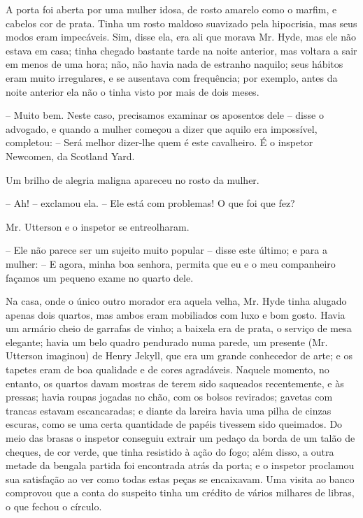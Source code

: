 A porta foi aberta por uma mulher idosa, de rosto amarelo como o marfim,
e cabelos cor de prata.  Tinha um rosto maldoso suavizado pela
hipocrisia, mas seus modos eram impecáveis.  Sim, disse ela, era ali
que morava Mr. Hyde, mas ele não estava em casa; tinha chegado bastante
tarde na noite anterior, mas voltara a sair em menos de uma hora; não,
não havia nada de estranho naquilo; seus hábitos eram muito
irregulares, e se ausentava com frequência; por exemplo, antes da noite
anterior ela não o tinha visto por mais de dois meses.

-- Muito bem.  Neste caso, precisamos examinar os aposentos dele --
disse o advogado, e quando a mulher começou a dizer que aquilo era
impossível, completou: -- Será melhor dizer-lhe quem é este cavalheiro. 
É o inspetor Newcomen, da Scotland Yard.

Um brilho de alegria maligna apareceu no rosto da mulher.

-- Ah! -- exclamou ela. -- Ele está com problemas!  O que foi que fez?

Mr. Utterson e o inspetor se entreolharam.

-- Ele não parece ser um sujeito muito popular -- disse este último; e
para a mulher: -- E agora, minha boa senhora, permita que eu e o meu
companheiro façamos um pequeno exame no quarto dele.

Na casa, onde o único outro morador era aquela velha, Mr. Hyde tinha
alugado apenas dois quartos, mas ambos eram mobiliados com luxo e bom
gosto.  Havia um armário cheio de garrafas de vinho; a baixela era de
prata, o serviço de mesa elegante; havia um belo quadro pendurado numa
parede, um presente (Mr. Utterson imaginou) de Henry Jekyll, que era um
grande conhecedor de arte; e os tapetes eram de boa qualidade e de
cores agradáveis. Naquele momento, no entanto, os quartos davam mostras
de terem sido saqueados recentemente, e às pressas; havia roupas
jogadas no chão, com os bolsos revirados; gavetas com trancas estavam
escancaradas; e diante da lareira havia uma pilha de cinzas escuras,
como se uma certa quantidade de papéis tivessem sido queimados.  Do
meio das brasas o inspetor conseguiu extrair um pedaço da borda de um
talão de cheques, de cor verde, que tinha resistido à ação do fogo;
além disso, a outra metade da bengala partida foi encontrada atrás da
porta; e o inspetor proclamou sua satisfação ao ver como todas estas
peças se encaixavam.  Uma visita ao banco comprovou que a conta do
suspeito tinha um crédito de vários milhares de libras, o que fechou o
círculo.


